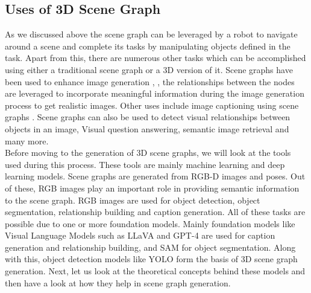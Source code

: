 \subsection{Uses of 3D Scene Graph}
As we discussed above the scene graph can be leveraged by a robot to navigate around a scene and complete its tasks by manipulating objects defined in the task. 
Apart from this, there are numerous other tasks which can be accomplished using either a traditional scene graph or a 3D version of it. Scene graphs have been 
used to enhance image generation \cite{tripathi2019usingscenegraphcontext}, \cite{johnson2018imagegenerationscenegraphs}, 
the relationships between the nodes are leveraged to incorporate meaningful information during the image generation process to get realistic images.
 Other uses include image captioning using scene graphs \cite{8953305}. 
 Scene graphs can also be used to detect visual relationships between objects in an image, Visual question answering, semantic image retrieval and many more. \\
Before moving to the generation of 3D scene graphs, we will look at the tools used during this process. 
These tools are mainly machine learning and deep learning models. Scene graphs are generated from RGB-D images and poses. 
Out of these, RGB images play an important role in providing semantic information to the scene graph. RGB images are used for object detection,
object segmentation, relationship building and caption generation. All of these tasks are possible due to one or more foundation models.
Mainly foundation models like Visual Language Models such as LLaVA \cite{liu2023visualinstructiontuning} and GPT-4 \cite{openai2024gpt4technicalreport} are used for caption generation and 
relationship building, and SAM \cite{kirillov2023segment} for object segmentation. Along with this, object detection models like YOLO \cite{cheng2024yolow} form the basis of 
3D scene graph generation. 
Next, let us look at the theoretical concepts behind these models and then have a look at how they help in scene graph generation.
